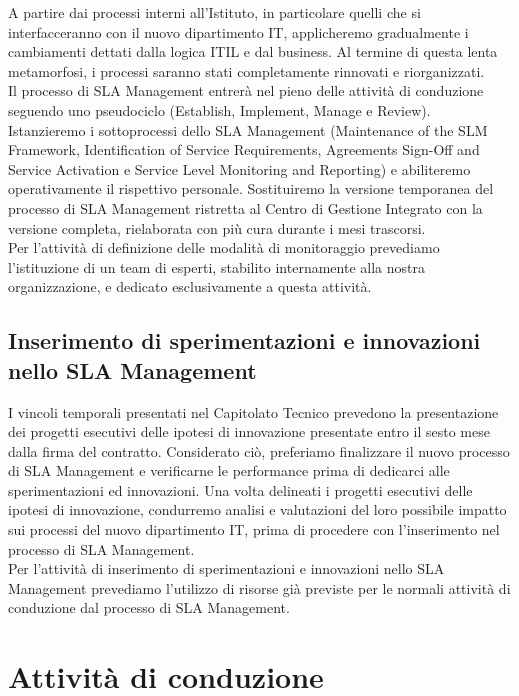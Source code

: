 A partire dai processi interni all'Istituto, in particolare quelli che si interfacceranno con il nuovo dipartimento IT, applicheremo gradualmente i cambiamenti dettati dalla logica ITIL e dal business. Al termine di questa lenta metamorfosi, i processi saranno stati completamente rinnovati e riorganizzati.
\\
Il processo di SLA Management entrerà nel pieno delle attività di conduzione seguendo uno pseudociclo (Establish, Implement, Manage e Review). Istanzieremo i sottoprocessi dello SLA Management (Maintenance of the SLM Framework, Identification of Service Requirements, Agreements Sign-Off and Service Activation e Service Level Monitoring and Reporting) e abiliteremo operativamente il rispettivo personale. Sostituiremo la versione temporanea del processo di SLA Management ristretta al Centro di Gestione Integrato con la versione completa, rielaborata con più cura durante i mesi trascorsi.
\\
Per l'attività di definizione delle modalità di monitoraggio prevediamo l'istituzione di un team di esperti, stabilito internamente alla nostra organizzazione, e dedicato esclusivamente a questa attività.

\subsection{Inserimento di sperimentazioni e innovazioni nello SLA Management}

I vincoli temporali presentati nel Capitolato Tecnico prevedono la presentazione dei progetti esecutivi delle ipotesi di innovazione presentate entro il sesto mese dalla firma del contratto. Considerato ciò, preferiamo finalizzare il nuovo processo di SLA Management e verificarne le performance prima di dedicarci alle sperimentazioni ed innovazioni. Una volta delineati i progetti esecutivi delle ipotesi di innovazione, condurremo analisi e valutazioni del loro possibile impatto sui processi del nuovo dipartimento IT, prima di procedere con l'inserimento nel processo di SLA Management.
\\
Per l'attività di inserimento di sperimentazioni e innovazioni nello SLA Management prevediamo l'utilizzo di risorse già previste per le normali attività di conduzione dal processo di SLA Management.


\section{Attività di conduzione}

